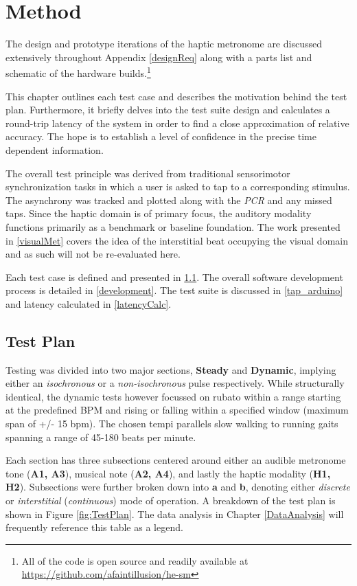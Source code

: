 \chapter{Method}
The design and prototype iterations of the haptic metronome are discussed extensively throughout Appendix \ref{designReq} along with a parts list and schematic of the hardware builds.\footnote{All of the code is open source and readily available at \url{https://github.com/afaintillusion/he-sm}}

This chapter outlines each test case and describes the motivation behind the test plan. Furthermore, it briefly delves into the test suite design and calculates a round-trip latency of the system in order to find a close approximation of relative accuracy. The hope is to establish a level of confidence in the precise time dependent information.

The overall test principle was derived from traditional sensorimotor synchronization tasks in which a user is asked to tap to a corresponding stimulus. The asynchrony was tracked and plotted along with the \textit{PCR} and any missed taps. Since the haptic domain is of primary focus, the auditory modality functions primarily as a benchmark or baseline foundation. The work presented in \ref{visualMet} covers the idea of the interstitial beat occupying the visual domain and as such will not be re-evaluated here.

Each test case is defined and presented in \ref{testPlan}. The overall software development process is detailed in \ref{development}. The test suite is discussed in \ref{tap_arduino} and latency calculated in \ref{latencyCalc}.

\section{Test Plan} \label{testPlan}
Testing was divided into two major sections, \textbf{Steady} and \textbf{Dynamic}, implying either an \textit{isochronous} or a \textit{non-isochronous} pulse respectively. While structurally identical, the dynamic tests however focussed on rubato within a range starting at the predefined BPM and rising or falling within a specified window (maximum span of +/- 15 bpm). The chosen tempi parallels slow walking to running gaits spanning a range of 45-180 beats per minute.

Each section has three subsections centered around either an audible metronome tone (\textbf{A1, A3}), musical note (\textbf{A2, A4}), and lastly the haptic modality (\textbf{H1, H2}). Subsections were further broken down into \textbf{a} and \textbf{b}, denoting either \textit{discrete} or \textit{interstitial} (\textit{continuous}) mode of operation. A breakdown of the test plan is shown in Figure \ref{fig:TestPlan}. The data analysis in Chapter \ref{DataAnalysis} will frequently reference this table as a legend.

